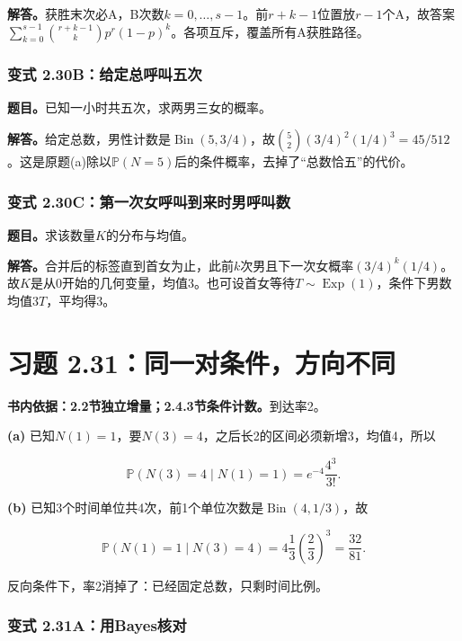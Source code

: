\documentclass[12pt,a4paper,UTF8,fontset=fandol]{ctexart}
\begin{document}
\textbf{解答。}获胜末次必A，B次数\(k=0,\ldots,s-1\)。前\(r+k-1\)位置放\(r-1\)个A，故答案\(\sum_{k=0}^{s-1}\binom{r+k-1}{k}p^r(1-p)^k\)。各项互斥，覆盖所有A获胜路径。

\subsubsection{变式
2.30B：给定总呼叫五次}\label{ux53d8ux5f0f-2.30bux7ed9ux5b9aux603bux547cux53ebux4e94ux6b21}

\textbf{题目。}已知一小时共五次，求两男三女的概率。

\textbf{解答。}给定总数，男性计数是\(\operatorname{Bin}(5,3/4)\)，故\(\binom52(3/4)^2(1/4)^3=45/512\)。这是原题(a)除以\(\mathbb P(N=5)\)后的条件概率，去掉了``总数恰五''的代价。

\subsubsection{变式
2.30C：第一次女呼叫到来时男呼叫数}\label{ux53d8ux5f0f-2.30cux7b2cux4e00ux6b21ux5973ux547cux53ebux5230ux6765ux65f6ux7537ux547cux53ebux6570}

\textbf{题目。}求该数量\(K\)的分布与均值。

\textbf{解答。}合并后的标签直到首女为止，此前\(k\)次男且下一次女概率\((3/4)^k(1/4)\)。故\(K\)是从0开始的几何变量，均值3。也可设首女等待\(T\sim\operatorname{Exp}(1)\)，条件下男数均值\(3T\)，平均得3。

\section{习题
2.31：同一对条件，方向不同}\label{ux4e60ux9898-2.31ux540cux4e00ux5bf9ux6761ux4ef6ux65b9ux5411ux4e0dux540c}

\textbf{书内依据：2.2节独立增量；2.4.3节条件计数。}到达率2。

\textbf{(a)}
已知\(N(1)=1\)，要\(N(3)=4\)，之后长2的区间必须新增3，均值4，所以

\[\boxed{\mathbb P(N(3)=4\mid N(1)=1)=e^{-4}\frac{4^3}{3!}.}\]

\textbf{(b)}
已知3个时间单位共4次，前1个单位次数是\(\operatorname{Bin}(4,1/3)\)，故

\[\boxed{\mathbb P(N(1)=1\mid N(3)=4)=4\frac13\left(\frac23\right)^3=\frac{32}{81}.}\]

反向条件下，率2消掉了：已经固定总数，只剩时间比例。

\subsubsection{变式
2.31A：用Bayes核对}\label{ux53d8ux5f0f-2.31aux7528bayesux6838ux5bf9}
\end{document}
